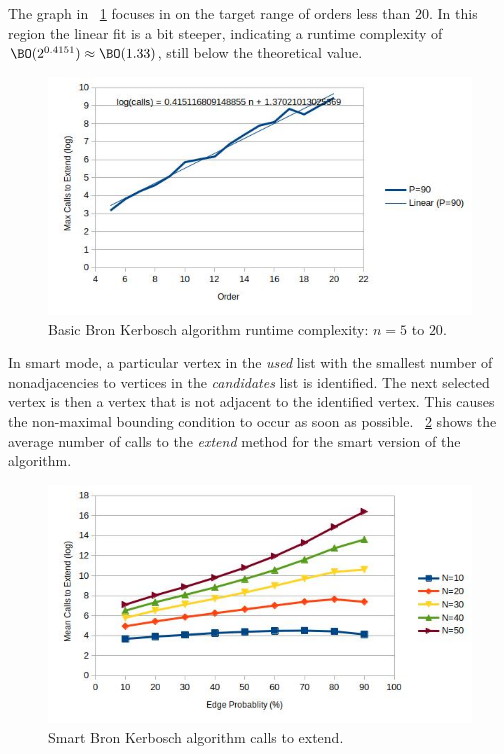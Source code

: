 The graph in \figurename~\ref{fig:bron1:runtime2} focuses in on the target range of orders less than \(20\).  In
this region the linear fit is a bit steeper, indicating a runtime complexity of
\(\BO(2^{0.4151})\approx\BO(1.33)\), still below the theoretical value.

\begin{figure}[H]
  \centering
  \includegraphics[width=5in]{bron1_runtime_2}
  \caption{Basic Bron Kerbosch algorithm runtime complexity: \(n=5\) to \(20\).}
  \label{fig:bron1:runtime2}
\end{figure}

In smart mode, a particular vertex in the \emph{used} list with the smallest number of nonadjacencies to vertices
in the \emph{candidates} list is identified.  The next selected vertex is then a vertex that is not adjacent to the
identified vertex.  This causes the non-maximal bounding condition to occur as soon as possible.
\figurename~\ref{fig:bron2:calls} shows the average number of calls to the \emph{extend} method for the smart
version of the algorithm.

\begin{figure}[H]
  \centering
  \includegraphics[width=5in]{bron1_calls}
  \caption{Smart Bron Kerbosch algorithm calls to extend.}
  \label{fig:bron2:calls}
\end{figure}

